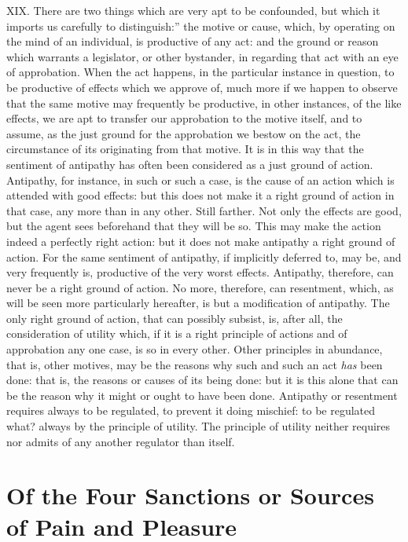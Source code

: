 \documentclass[12pt]{report}
\begin{document}
XIX. There are two things which are very apt to be confounded, but which
it imports us carefully to distinguish:'' the motive or cause,
which, by operating on the mind of an individual, is productive of any
act: and the ground or reason which warrants a legislator, or other
bystander, in regarding that act with an eye of approbation. When the
act happens, in the particular instance in question, to be productive of
effects which we approve of, much more if we happen to observe that the
same motive may frequently be productive, in other instances, of the
like effects, we are apt to transfer our approbation to the motive
itself, and to assume, as the just ground for the approbation we bestow
on the act, the circumstance of its originating from that motive. It is
in this way that the sentiment of antipathy has often been considered as
a just ground of action. Antipathy, for instance, in such or such a
case, is the cause of an action which is attended with good effects: but
this does not make it a right ground of action in that case, any more
than in any other. Still farther. Not only the effects are good, but the
agent sees beforehand that they will be so. This may make the action
indeed a perfectly right action: but it does not make antipathy a right
ground of action. For the same sentiment of antipathy, if implicitly
deferred to, may be, and very frequently is, productive of the very
worst effects. Antipathy, therefore, can never be a right ground of
action. No more, therefore, can resentment, which, as will be seen more
particularly hereafter, is but a modification of antipathy. The only
right ground of action, that can possibly subsist, is, after all, the
consideration of utility which, if it is a right principle of actions
and of approbation any one case, is so in every other. Other principles
in abundance, that is, other motives, may be the reasons why such and
such an act \emph{has} been done: that is, the reasons or causes of its
being done: but it is this alone that can be the reason why it might or
ought to have been done. Antipathy or resentment requires always to be
regulated, to prevent it doing mischief: to be regulated what? always by
the principle of utility. The principle of utility neither requires nor
admits of any another regulator than itself.

\chapter{Of the Four Sanctions or Sources of Pain and
Pleasure}
\end{document}
